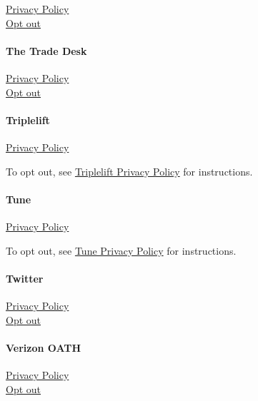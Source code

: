 \href{https://www.snap.com/en-US/privacy/privacy-policy}{Privacy
Policy}\\
\href{https://support.snapchat.com/en-US/a/advertising-preferences}{Opt
out}

\hypertarget{the-trade-desk}{%
\paragraph{The Trade Desk}\label{the-trade-desk}}

\href{https://www.thetradedesk.com/general/privacy}{Privacy Policy}\\
\href{https://www.thetradedesk.com/general/privacy\#_Toc514494731}{Opt
out}

\hypertarget{triplelift}{%
\paragraph{Triplelift}\label{triplelift}}

\href{https://triplelift.com/privacy/}{Privacy Policy}

To opt out, see \href{https://triplelift.com/privacy/}{Triplelift
Privacy Policy} for instructions.

\hypertarget{tune}{%
\paragraph{Tune}\label{tune}}

\href{https://www.tune.com/resources/data-and-privacy/privacy-policies/}{Privacy
Policy}

To opt out, see
\href{https://www.tune.com/resources/data-and-privacy/privacy-policies/}{Tune
Privacy Policy} for instructions.

\hypertarget{twitter}{%
\paragraph{Twitter}\label{twitter}}

\href{https://twitter.com/en/privacy}{Privacy Policy}\\
\href{https://help.twitter.com/en/safety-and-security/privacy-controls-for-tailored-ads}{Opt
out}

\hypertarget{verizon-oath}{%
\paragraph{Verizon OATH}\label{verizon-oath}}

\href{https://www.verizonmedia.com/policies/in/en/verizonmedia/privacy/index.html}{Privacy
Policy}\\
\href{https://www.verizonmedia.com/policies/in/en/verizonmedia/privacy/controls/index.html}{Opt
out}

